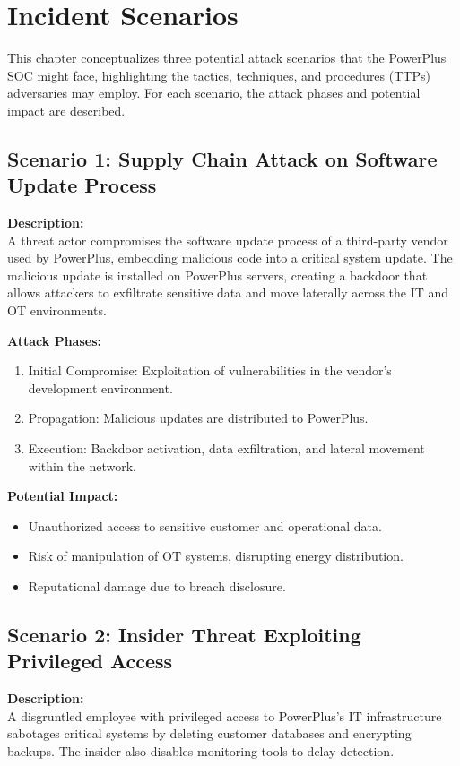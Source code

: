 \chapter{Incident Scenarios}

This chapter conceptualizes three potential attack scenarios that the PowerPlus SOC might face, highlighting the tactics, techniques, and procedures (TTPs) adversaries may employ. For each scenario, the attack phases and potential impact are described.

\section{Scenario 1: Supply Chain Attack on Software Update Process}

\textbf{Description:} \\
A threat actor compromises the software update process of a third-party vendor used by PowerPlus, embedding malicious code into a critical system update. The malicious update is installed on PowerPlus servers, creating a backdoor that allows attackers to exfiltrate sensitive data and move laterally across the IT and OT environments.

\textbf{Attack Phases:}
\begin{enumerate}
    \item Initial Compromise: Exploitation of vulnerabilities in the vendor's development environment.
    \item Propagation: Malicious updates are distributed to PowerPlus.
    \item Execution: Backdoor activation, data exfiltration, and lateral movement within the network.
\end{enumerate}

\textbf{Potential Impact:}
\begin{itemize}
    \item Unauthorized access to sensitive customer and operational data.
    \item Risk of manipulation of OT systems, disrupting energy distribution.
    \item Reputational damage due to breach disclosure.
\end{itemize}

\section{Scenario 2: Insider Threat Exploiting Privileged Access}

\textbf{Description:} \\
A disgruntled employee with privileged access to PowerPlus's IT infrastructure sabotages critical systems by deleting customer databases and encrypting backups. The insider also disables monitoring tools to delay detection.


